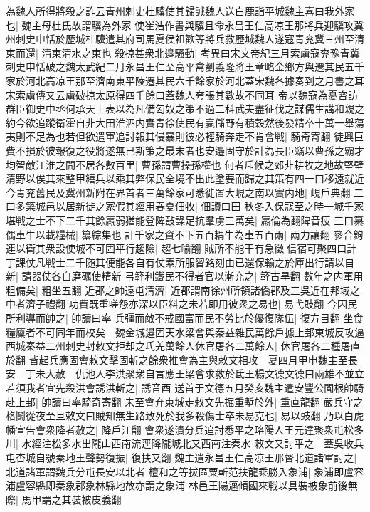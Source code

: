 為魏人所得將殺之詐云青州刺史杜驥使其歸誠魏人送白鹿詣平城魏主喜曰我外家也|{
	魏主母杜氏故謂驥為外家}
使崔浩作書與驥且命永昌王仁高凉王那將兵迎驥攻冀州刺史申恬於歷城杜驥遣其府司馬夏侯祖歡等將兵救歷城魏人遂寇青兖冀三州至清東而還|{
	清柬清水之東也}
殺掠甚衆北邉騷動|{
	考異曰宋文帝紀三月索虜寇兖豫青冀刺史申恬破之魏太武紀二月永昌王仁至高平禽劉義隆將王章略金鄉方與遷其民五千家於河北高凉王那至濟南東平陵遷其民六千餘家於河北蓋宋魏各據奏到之月書之耳宋索虜傳又云虜破掠太原得四千餘口蓋魏人夸張其數故不同耳}
帝以魏寇為憂咨訪群臣御史中丞何承天上表以為凡備匈奴之策不過二科武夫盡征伐之謀儒生講和親之約今欲追蹤衛霍自非大田淮泗内實青徐使民有贏儲野有積穀然後發精卒十萬一舉蕩夷則不足為也若但欲遣軍追討報其侵暴則彼必輕騎奔走不肯會戰|{
	騎奇寄翻}
徒興巨費不損於彼報復之役將遂無已斯策之最末者也安邉固守於計為長臣竊以曹孫之霸才均智敵江淮之間不居各數百里|{
	曹孫謂曹操孫權也}
何者斥候之郊非耕牧之地故堅壁清野以俟其來整甲繕兵以乘其弊保民全境不出此塗要而歸之其策有四一曰移遠就近今青兖舊民及冀州新附在界首者三萬餘家可悉徙置大峴之南以實内地|{
	峴戶典翻}
二曰多築城邑以居新徙之家假其經用春夏佃牧|{
	佃讀曰田}
秋冬入保寇至之時一城千家堪戰之士不下二千其餘羸弱猶能登陴鼔譟足抗羣虜三萬矣|{
	羸倫為翻陴音疲}
三曰纂偶車牛以載糧械|{
	纂綜集也}
計千家之資不下五百耦牛為車五百兩|{
	兩力讓翻}
參合鉤連以衛其衆設使城不可固平行趨險|{
	趨七喻翻}
賊所不能干有急徵信宿可聚四曰計丁課仗凡戰士二千随其便能各自有仗素所服習銘刻由已還保輸之於庫出行請以自新|{
	請器仗各自磨礪使精新}
弓簳利鐵民不得者官以漸充之|{
	簳古旱翻}
數年之内軍用粗備矣|{
	粗坐五翻}
近郡之師遠屯清濟|{
	近郡謂南徐州所領諸僑郡及三吳近在邦域之中者濟子禮翻}
功費既重嗟怨亦深以臣料之未若即用彼衆之易也|{
	易弋䜴翻}
今因民所利導而帥之|{
	帥讀曰率}
兵彊而敵不戒國富而民不勞比於優復隊伍|{
	復方目翻}
坐食糧廩者不可同年而校矣　魏金城邉固天水梁會與秦益雜民萬餘戶據上邽東城反攻逼西城秦益二州刺史封敕文拒却之氐羌萬餘人休官屠各二萬餘人|{
	休官屠各二種屠直於翻}
皆起兵應固會敕文擊固斬之餘衆推會為主與敕文相攻　夏四月甲申魏主至長安　丁未大赦　仇池人李洪聚衆自言應王梁會求救於氐王楊文德文德曰兩雄不並立若須我者宜先殺洪會誘洪斬之|{
	誘音酉}
送首于文德五月癸亥魏主遣安豐公閭根帥騎赴上邽|{
	帥讀曰率騎奇寄翻}
未至會弃東城走敕文先掘重塹於外|{
	重直龍翻}
嚴兵守之格鬭從夜至旦敕文曰賊知無生路致死於我多殺傷士卒未易克也|{
	易以豉翻}
乃以白虎幡宣告會衆降者赦之|{
	降戶江翻}
會衆遂潰分兵追討悉平之略陽人王元達聚衆屯松多川|{
	水經注松多水出隴山西南流逕降隴城北又西南注秦水}
敕文又討平之　蓋吳收兵屯杏城自號秦地王聲勢復振|{
	復扶又翻}
魏主遣永昌王仁高凉王那督北道諸軍討之|{
	北道諸軍謂魏兵分屯長安以北者}
檀和之等拔區粟斬范扶龍乘勝入象浦|{
	象浦即盧容浦盧容縣即秦象郡象林縣地故亦謂之象浦}
林邑王陽邁傾國來戰以具裝被象前後無際|{
	馬甲謂之其裝被皮義翻}
